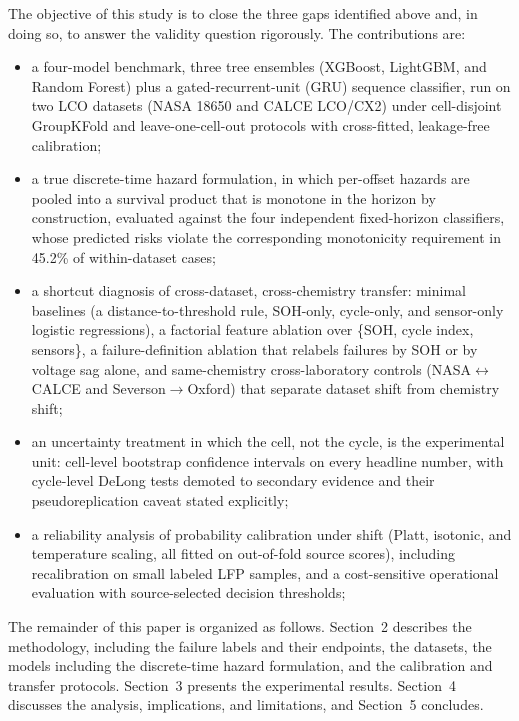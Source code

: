 \documentclass[IJPHM, 2014, 00]{PHMSociety}
\begin{document}
The objective of this study is to close the three gaps identified above and, in doing so, to answer the validity question rigorously. The contributions are:
\begin{itemize}
\item a four-model benchmark, three tree ensembles (XGBoost, LightGBM, and Random Forest) plus a gated-recurrent-unit (GRU) sequence classifier, run on two LCO datasets (NASA 18650 and CALCE LCO/CX2) under cell-disjoint GroupKFold and leave-one-cell-out protocols with cross-fitted, leakage-free calibration;
\item a true discrete-time hazard formulation, in which per-offset hazards are pooled into a survival product that is monotone in the horizon by construction, evaluated against the four independent fixed-horizon classifiers, whose predicted risks violate the corresponding monotonicity requirement in 45.2\% of within-dataset cases;
\item a shortcut diagnosis of cross-dataset, cross-chemistry transfer: minimal baselines (a distance-to-threshold rule, SOH-only, cycle-only, and sensor-only logistic regressions), a factorial feature ablation over \{SOH, cycle index, sensors\}, a failure-definition ablation that relabels failures by SOH or by voltage sag alone, and same-chemistry cross-laboratory controls (NASA$\leftrightarrow$CALCE and Severson$\to$Oxford) that separate dataset shift from chemistry shift;
\item an uncertainty treatment in which the cell, not the cycle, is the experimental unit: cell-level bootstrap confidence intervals on every headline number, with cycle-level DeLong tests demoted to secondary evidence and their pseudoreplication caveat stated explicitly;
\item a reliability analysis of probability calibration under shift (Platt, isotonic, and temperature scaling, all fitted on out-of-fold source scores), including recalibration on small labeled LFP samples, and a cost-sensitive operational evaluation with source-selected decision thresholds;
\end{itemize}

The remainder of this paper is organized as follows. Section~2 describes the methodology, including the failure labels and their endpoints, the datasets, the models including the discrete-time hazard formulation, and the calibration and transfer protocols. Section~3 presents the experimental results. Section~4 discusses the analysis, implications, and limitations, and Section~5 concludes.
\end{document}
